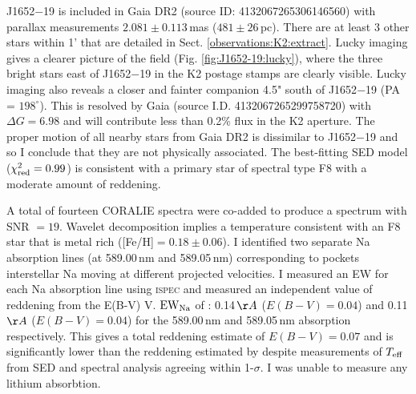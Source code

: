 J1652$-$19 is included in Gaia DR2 (source ID: 4132067265306146560) with parallax measurements $2.081 \pm 0.113$\,mas ($481 \pm 26$\,pc). There are at least 3 other stars within 1' that are detailed in Sect. \ref{observations:K2:extract}. Lucky imaging gives a clearer picture of the field (Fig. \ref{fig:J1652-19:lucky}), where the three bright stars east of J1652$-$19 in the K2 postage stamps are clearly visible. Lucky imaging also reveals a closer and fainter companion 4.5" south of J1652$-$19 (PA = $198^\circ$). This is resolved by Gaia (source I.D. 4132067265299758720) with $\Delta G = 6.98$ and will contribute less than 0.2\% flux in the K2 aperture. The proper motion of all nearby stars from Gaia DR2 is dissimilar to J1652$-$19 and so I conclude that they are not physically associated. The best-fitting SED model ($\chi_{\rm red}^2 = 0.99$) is consistent with a primary star of spectral type F8 with a moderate amount of reddening. 

A total of fourteen CORALIE spectra were co-added to produce a spectrum with SNR $ = 19$. Wavelet decomposition implies a temperature consistent with an F8 star that is metal rich ([Fe/H]$ = 0.18 \pm 0.06$). I identified two separate Na absorption lines (at 589.00\,nm and 589.05\,nm) corresponding to pockets interstellar Na moving at different projected velocities. I measured an EW for each Na absorption line using \textsc{ispec} and measured an independent value of reddening from the E(B-V) V. $\rm EW_{\rm Na}$ of \citet{2012MNRAS.426.1465P}: 0.14\,$\AA$ ($E(B-V) = 0.04$) and 0.11\,$\AA$ ($E(B-V) = 0.04$) for the 589.00\,nm and 589.05\,nm absorption respectively. This gives a total reddening estimate of $E(B-V) = 0.07$ and is significantly lower than the reddening estimated by \citet{2011ApJ...737..103S} despite measurements of $T_{\rm eff}$ from SED and spectral analysis agreeing within 1-$\sigma$. I was unable to measure any lithium absorbtion.


